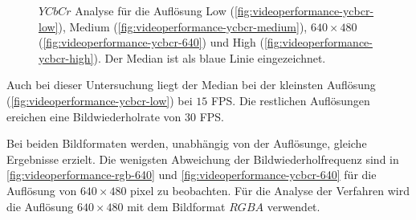 \begin{figure}[!ht]
	\centering
	\caption{$\mathit{YCbCr}$ Analyse für die Auflösung Low (\autoref{fig:videoperformance-ycbcr-low}),
	 Medium (\autoref{fig:videoperformance-ycbcr-medium}), $640 \times 480$ (\autoref{fig:videoperformance-ycbcr-640})
	 und High (\autoref{fig:videoperformance-ycbcr-high}). Der Median ist als blaue Linie eingezeichnet.}
	\label{fig:videoperformance-ycbcr}
\end{figure}
Auch bei dieser Untersuchung liegt der Median bei der kleinsten Auflösung (\autoref{fig:videoperformance-ycbcr-low})
 bei $15$ FPS. Die restlichen Auflösungen ereichen eine Bildwiederholrate von $30$ FPS.

Bei beiden Bildformaten werden, unabhängig von der Auflösunge, gleiche Ergebnisse erzielt. Die wenigsten Abweichung der
 Bildwiederholfrequenz sind in \autoref{fig:videoperformance-rgb-640} und \autoref{fig:videoperformance-ycbcr-640} für die
 Auflösung von $640 \times 480$ \gls{pixel} zu beobachten. Für die Analyse der Verfahren wird die Auflösung
 $640 \times 480$ mit dem Bildformat $\mathit{RGBA}$ verwendet.

